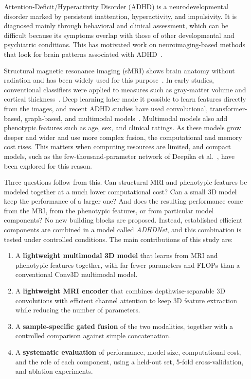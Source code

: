 \documentclass[runningheads]{llncs}
\begin{document}
Attention-Deficit/Hyperactivity Disorder (ADHD) is a neurodevelopmental disorder marked by persistent inattention, hyperactivity, and impulsivity. It is diagnosed mainly through behavioral and clinical assessment, which can be difficult because its symptoms overlap with those of other developmental and psychiatric conditions. This has motivated work on neuroimaging-based methods that look for brain patterns associated with ADHD~\cite{zhangjames2023,tian2024review,lohani2025review}.

Structural magnetic resonance imaging (sMRI) shows brain anatomy without radiation and has been widely used for this purpose~\cite{tian2024review}. In early studies, conventional classifiers were applied to measures such as gray-matter volume and cortical thickness~\cite{lohani2023}. Deep learning later made it possible to learn features directly from the images, and recent ADHD studies have used convolutional, transformer-based, graph-based, and multimodal models~\cite{firouzi2024,gulhan2025,wu2025hagcn,sorour2026}. Multimodal models also add phenotypic features such as age, sex, and clinical ratings. As these models grow deeper and wider and use more complex fusion, the computational and memory cost rises. This matters when computing resources are limited, and compact models, such as the few-thousand-parameter network of Deepika et al.~\cite{deepika2025}, have been explored for this reason.

Three questions follow from this. Can structural MRI and phenotypic features be modeled together at a much lower computational cost? Can a small 3D model keep the performance of a larger one? And does the resulting performance come from the MRI, from the phenotypic features, or from particular model components? No new building blocks are proposed. Instead, established efficient components are combined in a model called \emph{ADHDNet}, and this combination is tested under controlled conditions. The main contributions of this study are:
\begin{enumerate}
  \item A \textbf{lightweight multimodal 3D model} that learns from MRI and phenotypic features together, with far fewer parameters and FLOPs than a conventional Conv3D multimodal model.
  \item A \textbf{lightweight MRI encoder} that combines depthwise-separable 3D convolutions with efficient channel attention to keep 3D feature extraction while reducing the number of parameters.
  \item A \textbf{sample-specific gated fusion} of the two modalities, together with a controlled comparison against simple concatenation.
  \item A \textbf{systematic evaluation} of performance, model size, computational cost, and the role of each component, using a held-out set, 5-fold cross-validation, and ablation experiments.
\end{enumerate}
\end{document}

